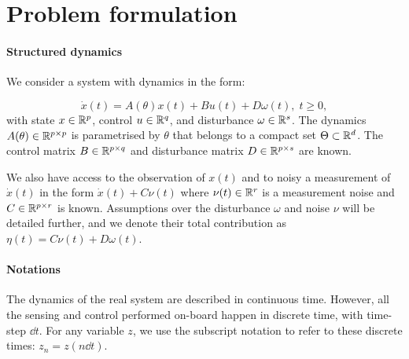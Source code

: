 \documentclass{article}
\begin{document}
\section{Problem formulation}

\paragraph{Structured dynamics}
We consider a system with dynamics in the form:

\begin{equation}
\label{eq:dynamics}
\dot{x}(t)=A(\theta)x(t) + B u(t) + D \omega(t),\;t\geq0,
\end{equation}
with state $x\in\mathbb{R}^p$, control $u\in\mathbb{R}^q$, and disturbance $\omega\in\mathbb{R}^s$. The dynamics $A(\theta)\in\mathbb{R}^{p\times p}$  is parametrised by $\theta$ that belongs to a compact set $\Theta \subset \mathbb{R}^d$. The control matrix $B\in\mathbb{R}^{p\times q}$ and disturbance matrix $D\in\mathbb{R}^{p\times s}$ are known.

We also have access to the observation of $x(t)$ and to noisy a measurement of $\dot{x}(t)$ in the form
$
    \dot{x}(t) + C\nu(t)
$ where $\nu(t)\in\mathbb{R}^r$ is a measurement noise and $C\in\mathbb{R}^{p\times r}$ is known. Assumptions over the disturbance $\omega$ and noise $\nu$ will be detailed further, and we denote their total contribution as $\eta(t) = C\nu(t) + D\omega(t)$.

\paragraph{Notations}

The dynamics of the real system are described in continuous time. However, all the sensing and control performed on-board happen in discrete time, with time-step $\dd t$. For any variable $z$, we use the subscript notation to refer to these discrete times: $z_n = z(n\dd t)$.




\end{document}

